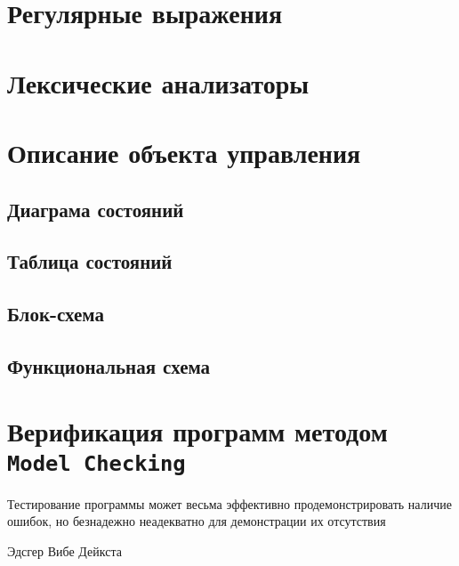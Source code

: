 \documentclass[12pt, twoside]{report}
\begin{document}
\chapter*{Регулярные выражения}

\chapter*{Лексические анализаторы}

\chapter*{Описание объекта управления}

\section*{Диаграма состояний}

\section*{Таблица состояний}

\section*{Блок-схема}

\section*{Функциональная схема}

\chapter*{Верификация программ методом \texttt{Model Checking}}

\epigraph{Тестирование программы может весьма эффективно продемонстрировать наличие ошибок, но безнадежно неадекватно для демонстрации их отсутствия}{Эдсгер Вибе Дейкста}
\end{document}
